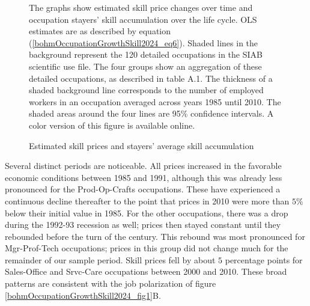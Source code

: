 \documentclass[12pt]{article}
\theoremstyle{definition}
\begin{document}
\begin{figure}[H]
    \noindent\caption{Estimated skill prices and stayers' average skill accumulation}
    \begin{center}
        \label{bohmOccupationGrowthSkill2024_fig5}
    \end{center}
    {\footnotesize The graphs show estimated skill price changes over time and occupation stayers' skill accumulation over the life cycle. OLS estimates are as described by equation (\ref{bohmOccupationGrowthSkill2024_eq6}). Shaded lines in the background represent the 120 detailed occupations in the SIAB scientific use file. The four groups show an aggregation of these detailed occupations, as described in table A.1. The thickness of a shaded background line corresponds to the number of employed workers in an occupation averaged across years 1985 until 2010. The shaded areas around the four lines are 95\% confidence intervals. A color version of this figure is available online.}
\end{figure}

Several distinct periods are noticeable. All prices increased in the favorable economic conditions between 1985 and 1991, although this was already less pronounced for the Prod-Op-Crafts occupations. These have experienced a continuous decline thereafter to the point that prices in 2010 were more than $5\%$ below their initial value in 1985. For the other occupations, there was a drop during the 1992-93 recession as well; prices then stayed constant until they rebounded before the turn of the century. This rebound was most pronounced for Mgr-Prof-Tech occupations; prices in this group did not change much for the remainder of our sample period. Skill prices fell by about $5$ percentage points for Sales-Office and Srvc-Care occupations between 2000 and 2010. These broad patterns are consistent with the job polarization of figure \ref{bohmOccupationGrowthSkill2024_fig1}B.
\end{document}
